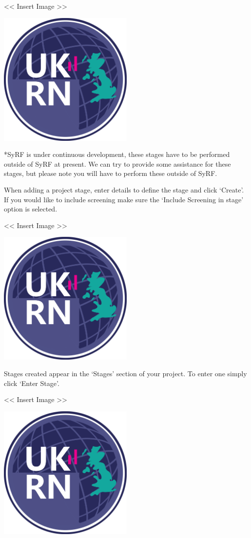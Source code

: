 \documentclass[]{book}
\begin{document}
\textless{}\textless{} Insert Image \textgreater{}\textgreater{}

\includegraphics[width=0.50000\textwidth,height=0.50000\textwidth]{figs/evidence-triangle.png}

*SyRF is under continuous development, these stages have to be performed
outside of SyRF at present. We can try to provide some assistance for
these stages, but please note you will have to perform these outside of
SyRF.

When adding a project stage, enter details to define the stage and click
`Create'. If you would like to include screening make sure the `Include
Screening in stage' option is selected.

\textless{}\textless{} Insert Image \textgreater{}\textgreater{}

\includegraphics[width=0.50000\textwidth,height=0.50000\textwidth]{figs/evidence-triangle.png}

Stages created appear in the `Stages' section of your project. To enter
one simply click `Enter Stage'.

\textless{}\textless{} Insert Image \textgreater{}\textgreater{}

\includegraphics[width=0.50000\textwidth,height=0.50000\textwidth]{figs/evidence-triangle.png}
\end{document}
